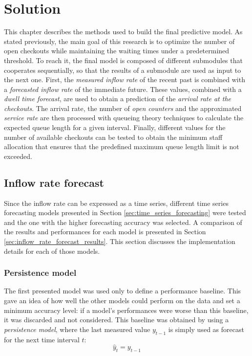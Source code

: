 \chapter{Solution}
\label{cha:solution}

This chapter describes the methods used to build the final predictive model. As stated previously, the main goal of this research is to optimize the number of open checkouts while maintaining the waiting times under a predetermined threshold. To reach it, the final model is composed of different submodules that cooperates sequentially, so that the results of a submodule are used as input to the next one. First, the \emph{measured inflow rate} of the recent past is combined with a \emph{forecasted inflow rate} of the immediate future. These values, combined with a \emph{dwell time forecast}, are used to obtain a prediction of the \emph{arrival rate at the checkouts}. The arrival rate, the number of \emph{open counters} and the approximated \emph{service rate} are then processed with queueing theory techniques to calculate the expected queue length for a given interval. Finally, different values for the number of available checkouts can be tested to obtain the minimum staff allocation that ensures that the predefined maximum queue length limit is not exceeded.

\section{Inflow rate forecast}
\label{sec:inflow_rate_forecast}

Since the inflow rate can be expressed as a time series, different time series forecasting models presented in Section \ref{sec:time_series_forecasting} were tested and the one with the higher forecasting accuracy was selected. A comparison of the results and performances for each model is presented in Section \ref{sec:inflow_rate_forecast_results}. This section discusses the implementation details for each of those models.

\subsection{Persistence model}
\label{subsec:persistence_model}

The first presented model was used only to define a performance baseline. This gave an idea of how well the other models could perform on the data and set a minimum accuracy level: if a model’s performances were worse than this baseline, it was discarded and not considered. This baseline was obtained by using a \emph{persistence model}, where the last measured value \( y_{t-1} \) is simply used as forecast for the next time interval \( t \):
\begin{equation}
  \hat{y}_t = y_{t-1}
\end{equation}


